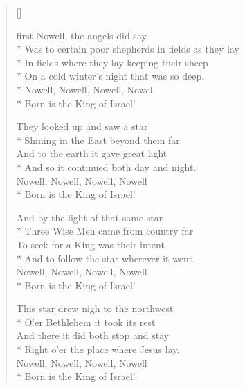 \newHymn


\begin{verse}[\versewidth]

\begin{patverse}
 first Nowell, the angels did say\\*
Was to certain poor shepherds in fields as they lay\\*
   In fields where they lay keeping their sheep\\*
    On a cold winter's night that was so deep.\\*
              Nowell, Nowell, Nowell, Nowell\\*
            Born is the King of Israel!
\end{patverse}

\begin{patverse}
They looked up and saw a star\\*
        Shining in the East beyond them far\\
       And to the earth it gave great light\\*
      And so it continued both day and night.\\
              Nowell, Nowell, Nowell, Nowell\\*
            Born is the King of Israel!
\end{patverse}

\begin{patverse}
And by the light of that same star\\*
       Three Wise Men came from country far\\
        To seek for a King was their intent\\*
     And to follow the star wherever it went.\\
              Nowell, Nowell, Nowell, Nowell\\*
            Born is the King of Israel!
\end{patverse}

\begin{patverse}
This star drew nigh to the northwest\\*
          O'er Bethlehem it took its rest\\
	  And there it did both stop and stay\\*
       Right o'er the place where Jesus lay.\\
              Nowell, Nowell, Nowell, Nowell\\*
            Born is the King of Israel!
\end{patverse}


\end{verse}
